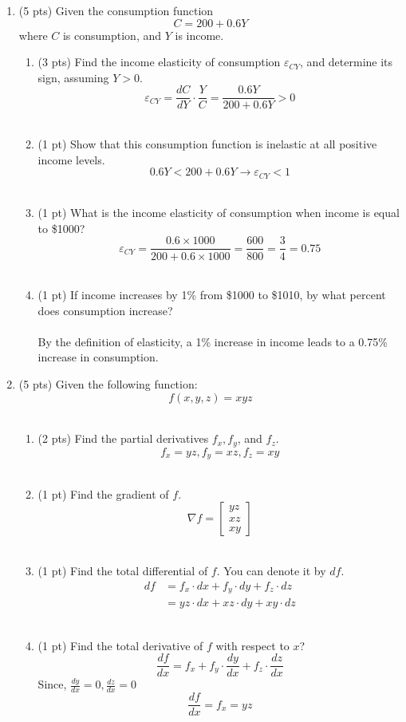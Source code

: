 \documentclass{./../../../Latex/tests}
\begin{document}
\begin{enumerate}
\newpage
\item (5 pts) Given the consumption function $$ C= 200+0.6Y  $$
where $C$ is consumption, and $Y$ is income. 
\begin{enumerate}
  \item (3 pts) Find the income elasticity of consumption $\varepsilon_{CY}$, and determine its sign, assuming $Y>0$. \\ 
 $$
\varepsilon_{CY}=\frac{d C}{d Y} \cdot \frac{Y}{C}=\frac{0.6 Y}{200+0.6 Y}>0 
$$ \\

  \item (1 pt) Show that this consumption function is inelastic at all positive income levels. 
  $$ 0.6 Y<200+0.6 Y \rightarrow \varepsilon_{CY}<1 $$ \\
  \item (1 pt) What is the income elasticity of consumption when income is equal to \$1000? 
$$
\varepsilon_{CY}=\frac{0.6 \times 1000}{200+0.6 \times 1000}=\frac{600}{800}=\frac{3}{4}=0.75
$$ \\
  \item (1 pt) If income increases by 1\% from \$1000 to \$1010, by what percent does consumption increase? \\~\\
  By the definition of elasticity, a 1\% increase in income leads to a 0.75\% increase in consumption. 
\end{enumerate}

\newpage

\item (5 pts) Given the following function:
$$f(x,y,z) = xyz$$ \\
\begin{enumerate}
\item (2 pts)  Find the partial derivatives $f_x, f_y$, and $f_z$. 
$$f_x=y z, f_y=x z, f_z=x y$$ \\
\item (1 pt) Find the gradient of $f$. 
$$\nabla f=\left[\begin{array}{l}y z \\ x z \\ x y\end{array}\right]$$ \\
\item (1 pt) Find the total differential of $f$. You can denote it by $d f$. 
$$\begin{aligned} d f &=f_x \cdot d x+f_y \cdot d y+f_z \cdot d z \\ &=y z \cdot d x+x z \cdot d y+x y \cdot d z
\end{aligned}$$	\\
\item (1 pt) Find the total derivative of $f$ with respect to $x$? 
$$  \frac{d f}{d x} =f_x+f_y \cdot \frac{d y}{d x}+f_z \cdot \frac{d z}{d x} $$
Since, $ \frac{d y}{d x}=0, \frac{d z}{d x}=0$ 
$$\frac{d f}{d x} =f_x=y z $$
\end{enumerate}


\end{enumerate}
\end{document}
